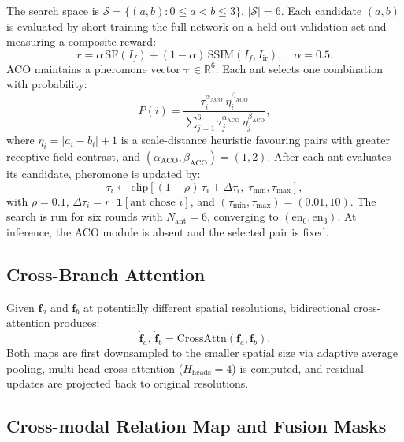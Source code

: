 \documentclass[a4paper,fleqn]{cas-dc}
\begin{document}
The search space is $\mathcal{S}=\{(a,b):0\le a<b\le3\}$,
$|\mathcal{S}|=6$.  Each candidate $(a,b)$ is evaluated by short-training
the full network on a held-out validation set and measuring a composite
reward:
\begin{equation}
  r = \alpha\,\mathrm{SF}(I_f) + (1-\alpha)\,\mathrm{SSIM}(I_f,I_\mathrm{ir}),
  \quad \alpha=0.5.
  \label{eq:reward}
\end{equation}
ACO maintains a pheromone vector
$\boldsymbol{\tau}\!\in\!\mathbb{R}^6$.  Each ant selects one combination
with probability:
\begin{equation}
  P(i) = \frac{\tau_i^{\alpha_\mathrm{ACO}}\,\eta_i^{\beta_\mathrm{ACO}}}
              {\sum_{j=1}^{6}\tau_j^{\alpha_\mathrm{ACO}}\,\eta_j^{\beta_\mathrm{ACO}}},
  \label{eq:prob}
\end{equation}
where $\eta_i=|a_i-b_i|+1$ is a scale-distance heuristic favouring pairs
with greater receptive-field contrast, and
$(\alpha_\mathrm{ACO},\beta_\mathrm{ACO})=(1,2)$.  After each ant
evaluates its candidate, pheromone is updated by:
\begin{equation}
  \tau_i \leftarrow
    \mathrm{clip}\!\left[(1-\rho)\,\tau_i + \Delta\tau_i,\;
    \tau_\mathrm{min},\tau_\mathrm{max}\right],
  \label{eq:aco}
\end{equation}
with $\rho=0.1$, $\Delta\tau_i=r\cdot\mathbf{1}[\text{ant chose }i]$, and
$(\tau_\mathrm{min},\tau_\mathrm{max})=(0.01,10)$.  The search is run for
six rounds with $N_\mathrm{ant}=6$, converging to
$(\mathrm{en}_0,\mathrm{en}_3)$.  At inference, the ACO module is absent
and the selected pair is fixed.

\subsection{Cross-Branch Attention}
\label{sec:method:cross}

Given $\mathbf{f}_a$ and $\mathbf{f}_b$ at potentially different spatial
resolutions, bidirectional cross-attention produces:
\begin{equation}
  \hat{\mathbf{f}}_a,\,\hat{\mathbf{f}}_b
    = \mathrm{CrossAttn}(\mathbf{f}_a, \mathbf{f}_b).
  \label{eq:cross}
\end{equation}
Both maps are first downsampled to the smaller spatial size via adaptive
average pooling, multi-head cross-attention ($H_\mathrm{heads}=4$) is
computed, and residual updates are projected back to original resolutions.

\subsection{Cross-modal Relation Map and Fusion Masks}
\label{sec:method:mask}
\end{document}
